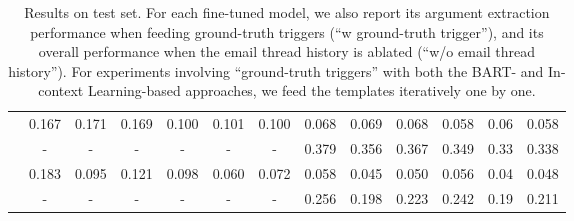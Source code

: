 \begin{table*}[th!]
{\begin{tabular}{lcccccccccccc}
\hspace{5mm}{text-davinci-003} &  0.167    &  0.171    &   0.169   & 0.100   &  0.101   &  0.100   &  0.068   &  0.069   &  0.068    &   0.058  &  0.06 &  0.058   \\
\hspace{8mm}{w/ ground-truth triggers} &  -    &  -    &   -   & -   &  -   &  -   &  0.379   &  0.356  & 0.367   &   0.349  &  0.33 &  0.338   \\
\hspace{5mm}{gpt-3.5-turbo} &  0.183    &  0.095    &   0.121   & 0.098   &  0.060   &  0.072   &  0.058   &  0.045   &  0.050    &   0.056  &  0.04 &  0.048   \\
\hspace{8mm}{w/ ground-truth triggers} &  -    &  -    &   -   & -   &  -   &  -   &  0.256   &  0.198   &  0.223    &   0.242  &  0.19 &  0.211   \\
\bottomrule
\end{tabular}
}
\caption{Results on \dataset test set. For each fine-tuned model, we also report its argument extraction performance when feeding ground-truth triggers (``{w ground-truth trigger}''), and its overall performance when the email thread history is ablated (``w/o email thread history''). For experiments involving ``ground-truth triggers'' with both the BART- and In-context Learning-based approaches, we feed the templates iteratively one by one.}
\label{tab:all_results}
\end{table*}